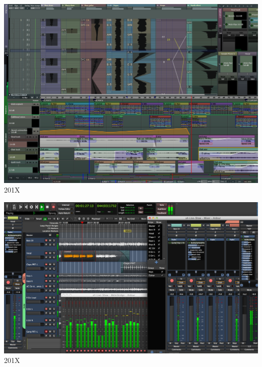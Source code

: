 \documentclass{beamer}
\begin{document}
\begin{frame}
  \begin{center}
    \includegraphics[scale=0.242]{images/radium_5_9_48-resized.png}\\
    201X
  \end{center}
\end{frame}

\begin{frame}
  \begin{center}
    \includegraphics[scale=0.234]{images/retina_no_plugs2.png}\\
    201X
  \end{center}
\end{frame}
\end{document}
